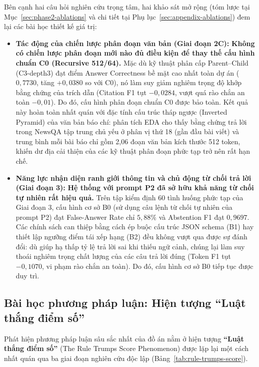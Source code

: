 Bên cạnh hai câu hỏi nghiên cứu trọng tâm, hai khảo sát mở rộng (tóm lược tại Mục~\ref{sec:phase2-ablations} và chi tiết tại Phụ lục~\ref{sec:appendix-ablations}) đem lại các bài học thiết kế giá trị:

\begin{itemize}
  \item \textbf{Tác động của chiến lược phân đoạn văn bản (Giai đoạn 2C):}
  \textbf{Không có chiến lược phân đoạn mới nào đủ điều kiện để thay thế cấu hình chuẩn C0 (Recursive 512/64).} Mặc dù kỹ thuật phân cấp Parent--Child (C3-depth3) đạt điểm Answer Correctness bề mặt cao nhất toàn dự án ($0{,}7730$, tăng $+0{,}0380$ so với C0), nó làm suy giảm nghiêm trọng độ khớp bằng chứng của trích dẫn (Citation F1 tụt $-0{,}0284$, vượt quá rào chắn an toàn $-0{,}01$). Do đó, cấu hình phân đoạn chuẩn C0 được bảo toàn. Kết quả này hoàn toàn nhất quán với đặc tính cấu trúc tháp ngược (Inverted Pyramid) của văn bản báo chí: phân tích EDA cho thấy bằng chứng trả lời trong NewsQA tập trung chủ yếu ở phân vị thứ 18 (gần đầu bài viết) và trung bình mỗi bài báo chỉ gồm 2,06 đoạn văn bản kích thước 512 token, khiến dư địa cải thiện của các kỹ thuật phân đoạn phức tạp trở nên rất hạn chế.

  \item \textbf{Năng lực nhận diện ranh giới thông tin và chủ động từ chối trả lời (Giai đoạn 3):}
  \textbf{Hệ thống với prompt P2 đã sở hữu khả năng từ chối tự nhiên rất hiệu quả.} Trên tập kiểm định 60 tình huống phức tạp của Giai đoạn 3, cấu hình cơ sở B0 (sử dụng câu lệnh từ chối tự nhiên của prompt P2) đạt False-Answer Rate chỉ $5{,}88\%$ và Abstention F1 đạt $0{,}9697$. Các chính sách can thiệp bằng cách ép buộc cấu trúc JSON schema (B1) hay thiết lập ngưỡng điểm tái xếp hạng (B2) đều không vượt qua được sự đánh đổi: dù giúp hạ thấp tỷ lệ trả lời sai khi thiếu ngữ cảnh, chúng lại làm suy thoái nghiêm trọng chất lượng của các câu trả lời đúng (Token F1 tụt $-0{,}1070$, vi phạm rào chắn an toàn). Do đó, cấu hình cơ sở B0 tiếp tục được duy trì.
\end{itemize}

\subsection{Bài học phương pháp luận: Hiện tượng ``Luật thắng điểm số''}

Phát hiện phương pháp luận sâu sắc nhất của đồ án nằm ở hiện tượng \textbf{``Luật thắng điểm số''} (The Rule Trumps Score Phenomenon) được lặp lại một cách nhất quán qua ba giai đoạn nghiên cứu độc lập (Bảng~\ref{tab:rule-trumps-score}).

